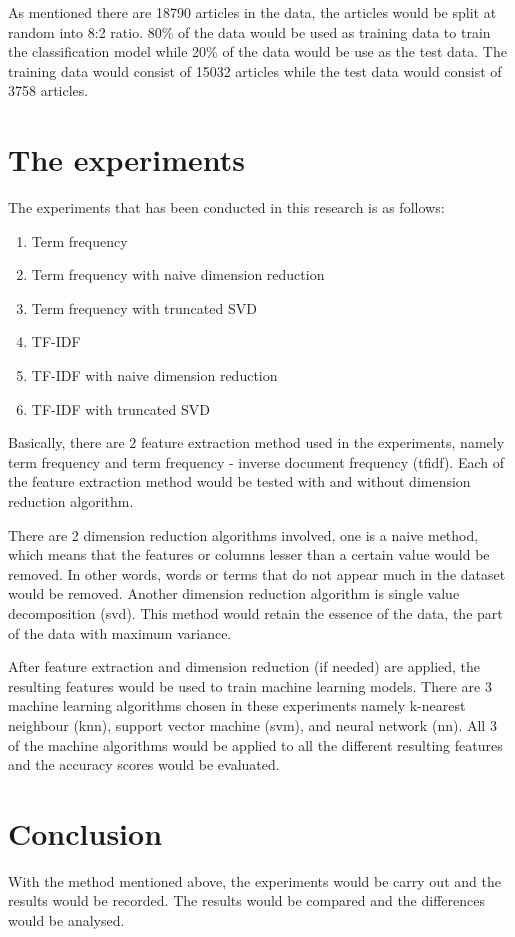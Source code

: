 As mentioned there are 18790 articles in the data, the articles would be split at random into 8:2 ratio. 80\% of the data would be used as training data to train the classification model while 20\% of the data would be use as the test data. The training data would consist of 15032 articles while the test data would consist of 3758 articles.\\


\clearpage
\section{The experiments}
The experiments that has been conducted in this research is as follows:
\begin{enumerate}
	\item Term frequency
	\item Term frequency with naive dimension reduction
	\item Term frequency with truncated SVD
	\item TF-IDF
	\item TF-IDF with naive dimension reduction
	\item TF-IDF with truncated SVD
\end{enumerate}

Basically, there are 2 feature extraction method used in the experiments, namely term frequency and term frequency - inverse document frequency (\ac{tfidf}). Each of the feature extraction method would be tested with and without dimension reduction algorithm.

There are 2 dimension reduction algorithms involved, one is a naive method, which means that the features or columns lesser than a certain value would be removed. In other words, words or terms that do not appear much in the dataset would be removed. Another dimension reduction algorithm is single value decomposition (\ac{svd}). This method would retain the essence of the data, the part of the data with maximum variance. 

After feature extraction and dimension reduction (if needed) are applied, the resulting features would be used to train machine learning models. There are 3 machine learning algorithms chosen in these experiments namely k-nearest neighbour (\ac{knn}), support vector machine (\ac{svm}), and neural network (\ac{nn}). All 3 of the machine algorithms would be applied to all the different resulting features and the accuracy scores would be evaluated.


\section{Conclusion}
With the method mentioned above, the experiments would be carry out and the results would be recorded. The results would be compared and the differences would be analysed.